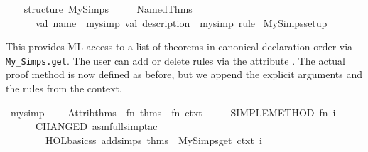 \begin{isabellebody}
\isamarkuptrue%
%
\isadelimML
%
\endisadelimML
%
\isatagML
{}\isamarkupfalse%
\ {}\isanewline
\ \ structure\ My{}Simps\ {}\isanewline
\ \ \ \ Named{}Thms\isanewline
\ \ \ \ \ \ {}val\ name\ {}\ {}my{}simp{}\ val\ description\ {}\ {}my{}simp\ rule{}{}\isanewline
{}\isanewline
{}\isamarkupfalse%
\ My{}Simps{}setup%
\endisatagML
{\isafoldML}%
%
\isadelimML
%
\endisadelimML
%
\begin{isamarkuptext}%
This provides ML access to a list of theorems in canonical
  declaration order via \verb|My_Simps.get|.  The user can add or
  delete rules via the attribute \hyperlink{attribute.my-simp}{\mbox{}}.  The actual
  proof method is now defined as before, but we append the explicit
  arguments and the rules from the context.%
\end{isamarkuptext}%
\isamarkuptrue%
%
\isadelimML
%
\endisadelimML
%
\isatagML
{}\isamarkupfalse%
\ my{}simp{}\ {}\ {}\isanewline
\ \ Attrib{}thms\ {}{}\ {}fn\ thms\ {}{}\ fn\ ctxt\ {}{}\isanewline
\ \ \ \ SIMPLE{}METHOD{}\ {}fn\ i\ {}{}\isanewline
\ \ \ \ \ \ CHANGED\ {}asm{}full{}simp{}tac\isanewline
\ \ \ \ \ \ \ \ {}HOL{}basic{}ss\ addsimps\ {}thms\ {}\ My{}Simps{}get\ ctxt{}{}\ i{}{}{}\isanewline

\end{isabellebody}
